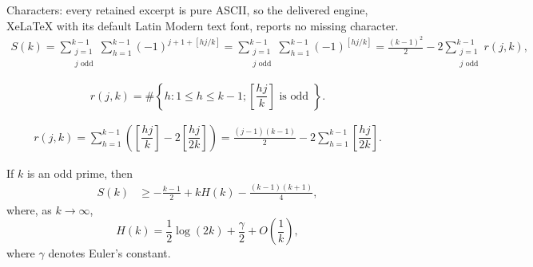 \documentclass[10pt,a4paper]{amsart}
\newcommand{\df}{\dfrac}
\begin{document}
Characters: every retained excerpt is pure ASCII, so the delivered engine, XeLaTeX with its default Latin Modern text font, reports no missing character.
\begin{align}
	S(k)=\sum_{\substack{j=1\\j\text{ odd}}}^{k-1}\sum_{h=1}^{k-1} (-1)^{j+1+[hj/k]}
	=\sum_{\substack{j=1\\j\text{ odd}}}^{k-1}\sum_{h=1}^{k-1} (-1)^{[hj/k]}
	=\frac{(k-1)^2}{2}-2\sum_{\substack{j=1\\j\text{ odd}}}^{k-1}r(j,k), \label{S_k_expression}
\end{align}

\begin{equation}\label{r}
r(j,k)= \#\left\{h: 1\leq h\leq k-1;  \left[\df{hj}{k}\right] \text{ is odd }\right\}.
\end{equation}

\begin{align}
    r(j,k)= \sum_{h=1}^{k-1} \left(\left[\df{hj}{k}\right]-2\left[\df{hj}{2k}\right]\right)
    =\frac{(j-1)(k-1)}{2}-2\sum_{h=1}^{k-1}\left[\df{hj}{2k}\right].\label{m_jk_expression}
  \end{align}

\begin{theorem}\label{theorem2} If $k$ is an odd prime, then
 \begin{align*}
	S(k)
	&\geq -\frac{k-1}{2}+kH(k)-\frac{(k-1)(k+1)}{4},
\end{align*}
where, as $k\to\infty$,
 $$H(k)=\frac{1}{2}\log\left(2k\right)+\frac{\gamma}{2}+O\left(\frac{1}{k}\right),$$
where $\gamma$ denotes Euler's constant.
\end{theorem}
\end{document}
